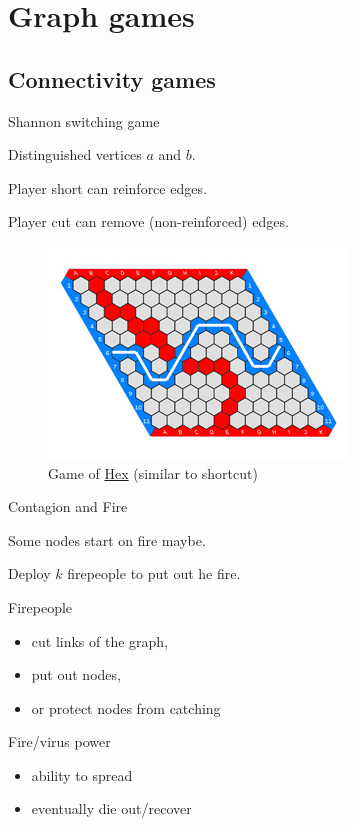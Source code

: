 \documentclass[compress]{beamer}
\newcommand{\blue}[1]{\textcolor{NordBlue}{#1}}
\newcommand{\red}[1]{\textcolor{NordRed}{#1}}
\newcommand{\yellow}[1]{\textcolor{NordYellow}{#1}}
\begin{document}
\section{Graph games}
\subsection{Connectivity games}
\begin{frame}{Shannon switching game}

Distinguished vertices $a$ and $b$.

\medskip

Player \blue{short} can reinforce edges.

\medskip

Player \red{cut} can remove (non-reinforced) edges.

\begin{figure}
    \centering
    \includegraphics[scale=0.6]{img/hex_board.jpg}
    \caption{Game of \href{https://en.wikipedia.org/wiki/Hex\_(board\_game)}{Hex} (similar to shortcut)}
    \label{fig:hex}
\end{figure}
\end{frame}

\begin{frame}{Contagion and Fire}

Some nodes start on fire maybe. \red{  } \yellow{\fontspec{Symbola} \symbol{"1F525} }

\smallskip

Deploy $k$ firepeople to put out he fire.

\begin{description}
\item Firepeople
\begin{itemize}
    \item cut links of the graph,
    \item put out nodes,
    \item or protect nodes from catching
\end{itemize}

\item Fire/virus power
\begin{itemize}
    \item ability to spread
    \item eventually die out/recover
\end{itemize}
\end{description}
\end{frame}
\end{document}
